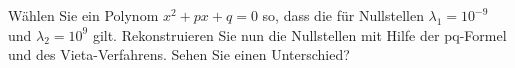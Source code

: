 Wählen Sie ein Polynom $x^2 + px + q = 0$ so, dass die für Nullstellen $\lambda_1 = 10^{-9}$ und $\lambda_2 = 10^9$ gilt. Rekonstruieren Sie nun die Nullstellen mit Hilfe der pq-Formel und des Vieta-Verfahrens. Sehen Sie einen Unterschied? 
